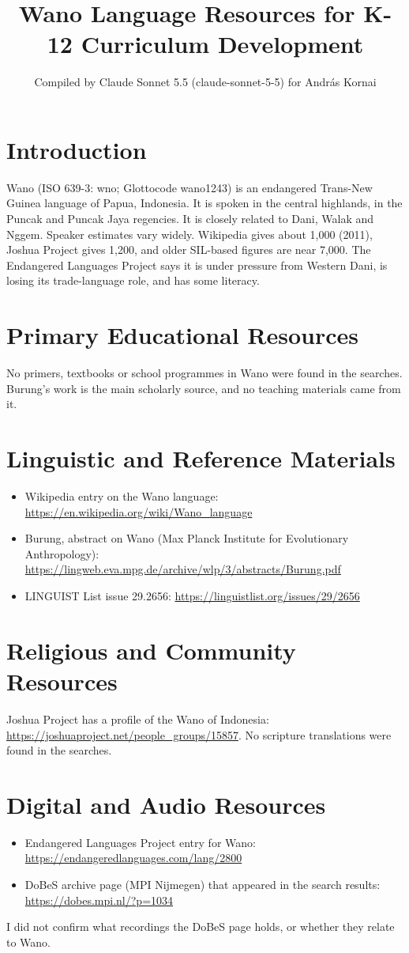 \documentclass[12pt]{article}
\title{Wano Language Resources for K-12 Curriculum Development}
\author{Compiled by Claude Sonnet 5.5 (claude-sonnet-5-5) for Andr\'as Kornai}
\date{}
\begin{document}
\maketitle

\section{Introduction}
Wano (ISO 639-3: wno; Glottocode wano1243) is an endangered Trans-New Guinea language of Papua, Indonesia. It is spoken in the central highlands, in the Puncak and Puncak Jaya regencies. It is closely related to Dani, Walak and Nggem. Speaker estimates vary widely. Wikipedia gives about 1,000 (2011), Joshua Project gives 1,200, and older SIL-based figures are near 7,000. The Endangered Languages Project says it is under pressure from Western Dani, is losing its trade-language role, and has some literacy.

\section{Primary Educational Resources}
No primers, textbooks or school programmes in Wano were found in the searches. Burung's work is the main scholarly source, and no teaching materials came from it.

\section{Linguistic and Reference Materials}
\begin{itemize}
\item Wikipedia entry on the Wano language: \url{https://en.wikipedia.org/wiki/Wano_language}
\item Burung, abstract on Wano (Max Planck Institute for Evolutionary Anthropology): \url{https://lingweb.eva.mpg.de/archive/wlp/3/abstracts/Burung.pdf}
\item LINGUIST List issue 29.2656: \url{https://linguistlist.org/issues/29/2656}
\end{itemize}

\section{Religious and Community Resources}
Joshua Project has a profile of the Wano of Indonesia: \url{https://joshuaproject.net/people_groups/15857}. No scripture translations were found in the searches.

\section{Digital and Audio Resources}
\begin{itemize}
\item Endangered Languages Project entry for Wano: \url{https://endangeredlanguages.com/lang/2800}
\item DoBeS archive page (MPI Nijmegen) that appeared in the search results: \url{https://dobes.mpi.nl/?p=1034}
\end{itemize}
I did not confirm what recordings the DoBeS page holds, or whether they relate to Wano.
\end{document}
